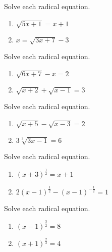 \begin{exercise}

Solve each radical equation.

\begin{enumerate}
\item
  \(\sqrt{5x+1}=x+1\)
\item
  \(x=\sqrt{3x+7}-3\)
\end{enumerate}

\end{exercise}

\begin{exercise}

Solve each radical equation.

\begin{enumerate}
\item
  \(\sqrt{6x+7}-x=2\)
\item
  \(\sqrt{x+2}+\sqrt{x-1}=3\)
\end{enumerate}

\end{exercise}

\begin{exercise}

Solve each radical equation.

\begin{enumerate}
\item
  \(\sqrt{x+5}-\sqrt{x-3}=2\)
\item
  \(3\sqrt[3]{3x-1}=6\)
\end{enumerate}

\end{exercise}

\begin{exercise}

Solve each radical equation.

\begin{enumerate}
\item
  \((x+3)^{\frac12}=x+1\)
\item
  \(2(x-1)^{\frac12}-(x-1)^{-\frac12}=1\)
\end{enumerate}

\end{exercise}

\begin{exercise}

Solve each radical equation.

\begin{enumerate}
\item
  \((x-1)^{\frac32}=8\)
\item
  \((x+1)^{\frac23}=4\)
\end{enumerate}

\end{exercise}


